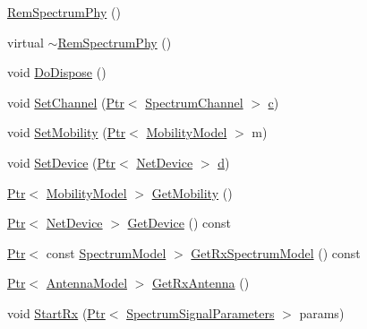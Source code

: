 \begin{DoxyCompactItemize}
\item 
\hyperlink{classns3_1_1RemSpectrumPhy_a100e387daa9172640b7813876e377bf5}{Rem\+Spectrum\+Phy} ()
\item 
virtual \hyperlink{classns3_1_1RemSpectrumPhy_afe02fa058bef785a7f7f1d77aced2c07}{$\sim$\+Rem\+Spectrum\+Phy} ()
\item 
void \hyperlink{classns3_1_1RemSpectrumPhy_a6af9c2e019c49ddd74a538d15ebeadd2}{Do\+Dispose} ()
\item 
void \hyperlink{classns3_1_1RemSpectrumPhy_ab5d3920e9d10c669a9b679c634d85454}{Set\+Channel} (\hyperlink{classns3_1_1Ptr}{Ptr}$<$ \hyperlink{classns3_1_1SpectrumChannel}{Spectrum\+Channel} $>$ \hyperlink{mmwave_2model_2fading-traces_2fading__trace__generator_8m_ae0323a9039add2978bf5b49550572c7c}{c})
\item 
void \hyperlink{classns3_1_1RemSpectrumPhy_a421e3d3a72fa50dda38a7356155874f1}{Set\+Mobility} (\hyperlink{classns3_1_1Ptr}{Ptr}$<$ \hyperlink{classns3_1_1MobilityModel}{Mobility\+Model} $>$ m)
\item 
void \hyperlink{classns3_1_1RemSpectrumPhy_ae75d57ec3ce80b1050aaa35ec87d5791}{Set\+Device} (\hyperlink{classns3_1_1Ptr}{Ptr}$<$ \hyperlink{classns3_1_1NetDevice}{Net\+Device} $>$ \hyperlink{lte__pathloss_8m_a1aabac6d068eef6a7bad3fdf50a05cc8}{d})
\item 
\hyperlink{classns3_1_1Ptr}{Ptr}$<$ \hyperlink{classns3_1_1MobilityModel}{Mobility\+Model} $>$ \hyperlink{classns3_1_1RemSpectrumPhy_ac34c623380d2318fc9b695a36cd96240}{Get\+Mobility} ()
\item 
\hyperlink{classns3_1_1Ptr}{Ptr}$<$ \hyperlink{classns3_1_1NetDevice}{Net\+Device} $>$ \hyperlink{classns3_1_1RemSpectrumPhy_a5893cb099cabdda6b0711945329e0c52}{Get\+Device} () const 
\item 
\hyperlink{classns3_1_1Ptr}{Ptr}$<$ const \hyperlink{classns3_1_1SpectrumModel}{Spectrum\+Model} $>$ \hyperlink{classns3_1_1RemSpectrumPhy_a2e097c7305e8bde10a3dd3e5c63eabaf}{Get\+Rx\+Spectrum\+Model} () const 
\item 
\hyperlink{classns3_1_1Ptr}{Ptr}$<$ \hyperlink{classns3_1_1AntennaModel}{Antenna\+Model} $>$ \hyperlink{classns3_1_1RemSpectrumPhy_a6580a4fc57f0d1e6f56fb72db5f92aae}{Get\+Rx\+Antenna} ()
\item 
void \hyperlink{classns3_1_1RemSpectrumPhy_a9ddd325516aae88f04bd688c08a27e0d}{Start\+Rx} (\hyperlink{classns3_1_1Ptr}{Ptr}$<$ \hyperlink{structns3_1_1SpectrumSignalParameters}{Spectrum\+Signal\+Parameters} $>$ params)

\end{DoxyCompactItemize}
